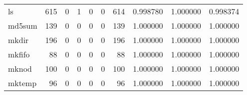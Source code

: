 \begin{tabular}{lrrrrrrrrr}
ls        &                                   615 &                                                  0 &                                                  1 &                                                  0 &                                                  0 &                                                614 &                                           0.998780 &                               1.000000 &                             0.998374 \\
md5sum    &                                   139 &                                                  0 &                                                  0 &                                                  0 &                                                  0 &                                                139 &                                           1.000000 &                               1.000000 &                             1.000000 \\
mkdir     &                                   196 &                                                  0 &                                                  0 &                                                  0 &                                                  0 &                                                196 &                                           1.000000 &                               1.000000 &                             1.000000 \\
mkfifo    &                                    88 &                                                  0 &                                                  0 &                                                  0 &                                                  0 &                                                 88 &                                           1.000000 &                               1.000000 &                             1.000000 \\
mknod     &                                   100 &                                                  0 &                                                  0 &                                                  0 &                                                  0 &                                                100 &                                           1.000000 &                               1.000000 &                             1.000000 \\
mktemp    &                                    96 &                                                  0 &                                                  0 &                                                  0 &                                                  0 &                                                 96 &                                           1.000000 &                               1.000000 &                             1.000000 \\

\end{tabular}
